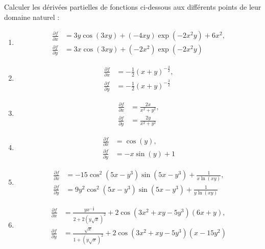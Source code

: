 \begin{solution}
    Calculer les dérivées partielles de fonctions ci-dessous aux différents points de leur domaine naturel :
    \begin{enumerate}[label=(\alph*)]
        \item 
        \[
        \begin{aligned}
            \frac{\partial f}{\partial x} &= 3y \cos(3xy) + (-4xy) \exp(-2x^2y) + 6x^2, \\
            \frac{\partial f}{\partial y} &= 3x \cos(3xy) + (-2x^2) \exp(-2x^2y)
        \end{aligned}
        \]
    
        \item 
        \[
        \begin{aligned}
            \frac{\partial f}{\partial x} &= -\frac{1}{2} (x+y)^{-\frac{3}{2}}, \\
            \frac{\partial f}{\partial y} &= -\frac{1}{2} (x+y)^{-\frac{3}{2}}
        \end{aligned}
        \]
    
        \item 
        \[
        \begin{aligned}
            \frac{\partial f}{\partial x} &= \frac{2x}{x^2 + y^2}, \\
            \frac{\partial f}{\partial y} &= \frac{2y}{x^2 + y^2}
        \end{aligned}
        \]
    
        \item 
        \[
        \begin{aligned}
            \frac{\partial f}{\partial x} &= \cos(y), \\
            \frac{\partial f}{\partial y} &= -x \sin(y) + 1
        \end{aligned}
        \]
    
        \item 
        \[
        \begin{aligned}
            \frac{\partial f}{\partial x} &= -15 \cos^2(5x - y^3) \sin(5x - y^3) + \frac{1}{x \ln(xy)}, \\
            \frac{\partial f}{\partial y} &= 9y^2 \cos^2(5x - y^3) \sin(5x - y^3) + \frac{1}{y \ln(xy)}
        \end{aligned}
        \]
    
        \item 
        \[
        \begin{aligned}
            \frac{\partial f}{\partial x} &= \frac{y x^{-\frac{1}{2}}}{2 + 2(y \sqrt{x})^2} + 2 \cos(3x^2 + xy - 5y^3)(6x + y), \\
            \frac{\partial f}{\partial y} &= \frac{\sqrt{x}}{1 + (y \sqrt{x})^2} + 2 \cos(3x^2 + xy - 5y^3)(x - 15y^2)
        \end{aligned}
        \]
    \end{enumerate}
\end{solution}

